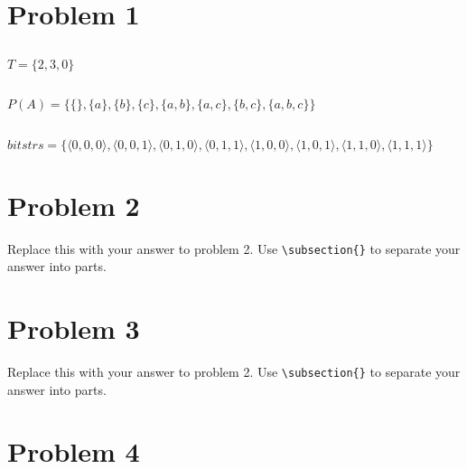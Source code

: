 \documentclass[titlepage]{article}
\begin{document}
 \maketitle

\section{Problem 1}

\subsection{}  %

\(T = \{2, 3, 0\}\)

\subsection{}  %

\(P(A) = \{\{\},\{a\},\{b\},\{c\},\{a,b\},\{a,c\},\{b,c\},\{a,b,c\}\}\)

\subsection{}  %

\( bitstrs = \{\langle0,0,0\rangle,\langle0,0,1\rangle,\langle0,1,0\rangle,\langle0,1,1\rangle,\langle1,0,0\rangle,\langle1,0,1\rangle,\langle1,1,0\rangle,\langle1,1,1\rangle\} \)


\section{Problem 2}

Replace this with your answer to problem 2.  Use \verb|\subsection{}| to separate your answer into parts.

\section{Problem 3}

Replace this with your answer to problem 2.  Use \verb|\subsection{}| to separate your answer into parts.

\section{Problem 4}
\end{document}
